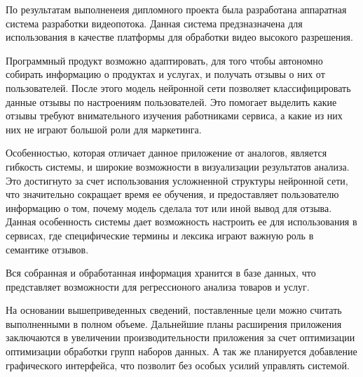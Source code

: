 
По результатам выполненеия дипломного проекта была разработана
аппаратная система разработки видеопотока. Данная система предзназначена
для использования в качестве платформы для обработки видео высокого разрешения.

Программный продукт возможно адаптировать, для того чтобы автономно собирать информацию о продуктах и услугах, и получать отзывы о них от пользователей.
После этого модель нейронной сети позволяет классифицировать данные отзывы по настроениям пользователей.
Это помогает выделить какие отзывы требуют внимательного изучения работниками сервиса, а какие из них них не играют большой роли для маркетинга.

Особенностью, которая отличает данное приложение от аналогов, является гибкость системы, и широкие возможности в визуализации результатов анализа.
Это достигнуто за счет использования усложненной структуры нейронной сети, что значительно сокращает время ее обучения, и предоставляет пользователю
информацию о том, почему модель сделала тот или иной вывод для отзыва. Данная особенность системы дает возможность настроить ее для использования в сервисах,
где специфические термины и лексика играют важную роль в семантике отзывов.

Вся собранная и обработанная информация хранится в базе данных, что представляет возможности для регрессионого анализа товаров и услуг.

На основании вышеприведенных сведений, поставленные цели можно считать выполненными в полном объеме.
Дальнейшие планы расширения приложения заключаются в увеличении производительности приложения за счет оптимизации оптимизации обработки групп наборов данных.
А так же планируется добавление графического интерфейса, что позволит без особых усилий управлять системой.
